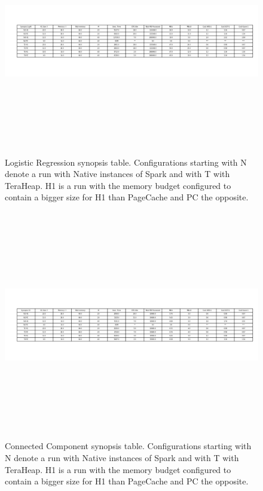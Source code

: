 \begin{figure}[ht]
        \includegraphics[width=20cm,height=10cm]{./fig/logr_table.png}
    \caption{Logistic Regression synopsis table. Configurations
    starting with N denote a run with Native instances of Spark and
    with T with TeraHeap. H1 is a run with the memory budget
    configured to contain a bigger size for H1 than PageCache and PC
    the opposite.}
	\label{fig:logr_table}
\end{figure}

\begin{figure}[ht]
        \includegraphics[width=20cm,height=10cm]{./fig/cc_table.png}
    \caption{Connected Component synopsis table. Configurations
    starting with N denote a run with Native instances of Spark and
    with T with TeraHeap. H1 is a run with the memory budget
    configured to contain a bigger size for H1 than PageCache and PC
    the opposite. }
	\label{fig:cc_table}
\end{figure}


